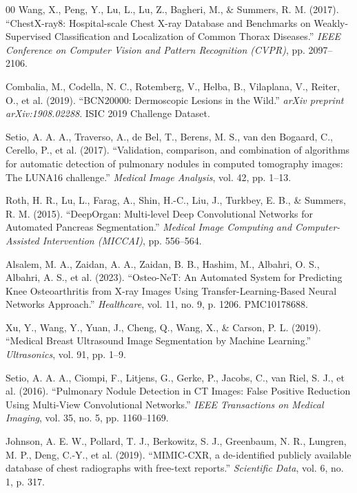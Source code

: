 \documentclass[conference, 11pt]{IEEEtran}
\begin{document}
\begin{thebibliography}{00}
 Wang, X., Peng, Y., Lu, L., Lu, Z., Bagheri, M., \& Summers, R. M. (2017). ``ChestX-ray8: Hospital-scale Chest X-ray Database and Benchmarks on Weakly-Supervised Classification and Localization of Common Thorax Diseases.'' \textit{IEEE Conference on Computer Vision and Pattern Recognition (CVPR)}, pp. 2097--2106.

 Combalia, M., Codella, N. C., Rotemberg, V., Helba, B., Vilaplana, V., Reiter, O., et al. (2019). ``BCN20000: Dermoscopic Lesions in the Wild.'' \textit{arXiv preprint arXiv:1908.02288}. ISIC 2019 Challenge Dataset.

 Setio, A. A. A., Traverso, A., de Bel, T., Berens, M. S., van den Bogaard, C., Cerello, P., et al. (2017). ``Validation, comparison, and combination of algorithms for automatic detection of pulmonary nodules in computed tomography images: The LUNA16 challenge.'' \textit{Medical Image Analysis}, vol. 42, pp. 1--13.

 Roth, H. R., Lu, L., Farag, A., Shin, H.-C., Liu, J., Turkbey, E. B., \& Summers, R. M. (2015). ``DeepOrgan: Multi-level Deep Convolutional Networks for Automated Pancreas Segmentation.'' \textit{Medical Image Computing and Computer-Assisted Intervention (MICCAI)}, pp. 556--564.

 Alsalem, M. A., Zaidan, A. A., Zaidan, B. B., Hashim, M., Albahri, O. S., Albahri, A. S., et al. (2023). ``Osteo-NeT: An Automated System for Predicting Knee Osteoarthritis from X-ray Images Using Transfer-Learning-Based Neural Networks Approach.'' \textit{Healthcare}, vol. 11, no. 9, p. 1206. PMC10178688.

 Xu, Y., Wang, Y., Yuan, J., Cheng, Q., Wang, X., \& Carson, P. L. (2019). ``Medical Breast Ultrasound Image Segmentation by Machine Learning.'' \textit{Ultrasonics}, vol. 91, pp. 1--9.

 Setio, A. A. A., Ciompi, F., Litjens, G., Gerke, P., Jacobs, C., van Riel, S. J., et al. (2016). ``Pulmonary Nodule Detection in CT Images: False Positive Reduction Using Multi-View Convolutional Networks.'' \textit{IEEE Transactions on Medical Imaging}, vol. 35, no. 5, pp. 1160--1169.

 Johnson, A. E. W., Pollard, T. J., Berkowitz, S. J., Greenbaum, N. R., Lungren, M. P., Deng, C.-Y., et al. (2019). ``MIMIC-CXR, a de-identified publicly available database of chest radiographs with free-text reports.'' \textit{Scientific Data}, vol. 6, no. 1, p. 317.

\end{thebibliography}
\end{document}
